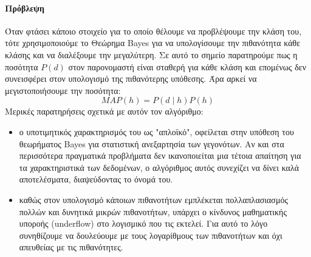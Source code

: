 \paragraph{Πρόβλεψη} Όταν φτάσει κάποιο στοιχείο για το οποίο θέλουμε να προβλέψουμε την κλάση του, τότε χρησιμοποιούμε το Θεώρημα Bayes για να υπολογίσουμε την πιθανότητα κάθε κλάσης και να διαλέξουμε την μεγαλύτερη. Σε αυτό το σημείο παρατηρούμε πως η ποσότητα $P(d)$ στον παρονομαστή είναι σταθερή
για κάθε κλάση και επομένως δεν συνεισφέρει στον υπολογισμό της πιθανότερης υπόθεσης. Άρα αρκεί να μεγιστοποιήσουμε την ποσότητα:
\begin{equation}
MAP(h)=P(d \mid h) P(h)
\end{equation}
Μερικές παρατηρήσεις σχετικά με αυτόν τον αλγόριθμο:
\begin{itemize}
	\item ο υποτιμητικός χαρακτηρισμός του ως "απλοϊκό", οφείλεται στην υπόθεση του θεωρήματος Bayes για στατιστική ανεξαρτησία των γεγονότων. Αν και στα περισσότερα πραγματικά προβλήματα δεν ικανοποιείται μια τέτοια απαίτηση για τα χαρακτηριστικά των δεδομένων, ο αλγόριθμος αυτός συνεχίζει να δίνει καλά αποτελέσματα, διαψεύδοντας το όνομά του.
	\item καθώς στον υπολογισμό κάποιων πιθανοτήτων εμπλέκεται πολλαπλασιασμός πολλών και δυνητικά μικρών πιθανοτήτων, υπάρχει ο κίνδυνος μαθηματικής υποροής (underflow) στο λογισμικό που τις εκτελεί. Για αυτό το λόγο συνηθίζουμε να δουλεύουμε με τους λογαρίθμους των πιθανοτήτων και όχι απευθείας με τις πιθανότητες.
\end{itemize}